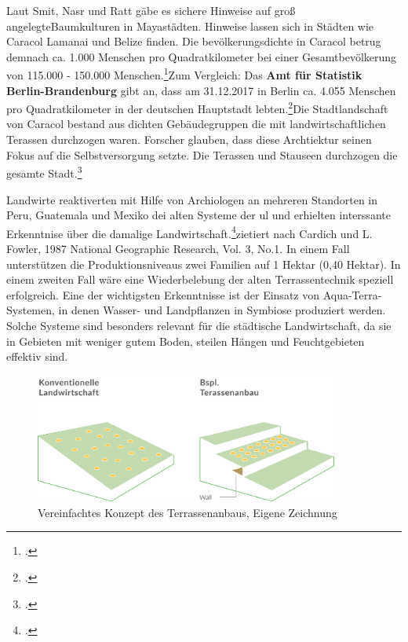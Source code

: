 \documentclass{scrartcl}
\begin{document}
Laut Smit, Nasr und Ratt gäbe es sichere Hinweise auf groß angelegteBaumkulturen in Mayastädten. Hinweise lassen sich in Städten wie Caracol Lamanai und Belize finden. Die bevölkerungsdichte in Caracol betrug demnach ca. 1.000 Menschen pro Quadratkilometer bei einer Gesamtbevölkerung von 115.000 - 150.000 Menschen.\footcite[Vgl.][S. 5-6]{Smit2001UrbanCities}Zum Vergleich: Das \textbf{Amt für Statistik Berlin-Brandenburg} gibt an, dass am 31.12.2017 in Berlin ca. 4.055 Menschen pro Quadratkilometer in der deutschen Hauptstadt lebten.\footcite[Vgl.]{AmtfurStatistikBerlin-Brandenburg2017NoTitle}Die Stadtlandschaft von Caracol bestand aus dichten Gebäudegruppen die mit landwirtschaftlichen Terassen durchzogen waren. Forscher glauben, dass diese Archtiektur seinen Fokus auf die Selbstversorgung setzte. Die Terassen und Stauseen durchzogen die gesamte Stadt.\footcite[Vgl.][S. 5-6]{Smit2001UrbanCities}

Landwirte reaktiverten mit Hilfe von Archiologen an mehreren Standorten in Peru, Guatemala und Mexiko dei alten Systeme der \acs{ul} und erhielten interssante Erkenntnise über die damalige Landwirtschaft.\footcite[Vgl.][S. 6]{Smit2001UrbanCities}{zietiert nach Cardich und L. Fowler, 1987 National Geographic Research, Vol. 3, No.1.}
In einem Fall unterstützen die Produktionsniveaus zwei Familien auf 1 Hektar (0,40 Hektar). In einem zweiten Fall wäre eine Wiederbelebung der alten Terrassentechnik speziell erfolgreich. Eine der wichtigsten Erkenntnisse ist der Einsatz von Aqua-Terra-Systemen, in denen Wasser- und Landpflanzen in Symbiose produziert werden. Solche Systeme sind besonders relevant für die städtische Landwirtschaft, da sie in Gebieten mit weniger gutem Boden, steilen Hängen und Feuchtgebieten effektiv sind. 

\begin{figure}[htbp]
\centering
\includegraphics[width=10cm]{image_folder/SchaubildTerassenanbau.png}
\caption{Vereinfachtes Konzept des Terrassenanbaus, Eigene Zeichnung}
\label{fig:Terassenlandwirtschaft}
\end{figure}
\end{document}

